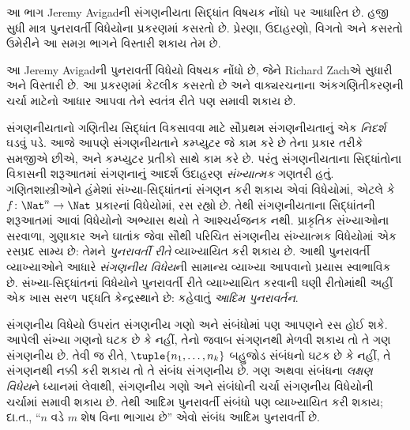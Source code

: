 
\label{guunit:OLP-0208}


\begin{editorial}
  આ ભાગ Jeremy Avigadની સંગણનીયતા સિદ્ધાંત વિષયક નોંધો પર આધારિત છે.
  હજી સુધી માત્ર પુનરાવર્તી વિધેયોના પ્રકરણમાં કસરતો છે. પ્રેરણા,
  ઉદાહરણો, વિગતો અને કસરતો ઉમેરીને આ સમગ્ર ભાગને વિસ્તારી શકાય તેમ છે.
\end{editorial}

\begingroup
\makeatletter{}\makeatother

\label{guunit:OLP-0209}


\begin{editorial}
  આ Jeremy Avigadની પુનરાવર્તી વિધેયો વિષયક નોંધો છે, જેને Richard Zachએ
  સુધારી અને વિસ્તારી છે. આ પ્રકરણમાં કેટલીક કસરતો છે અને વાક્યરચનાના
  અંકગણિતીકરણની ચર્ચા માટેનો આધાર આપવા તેને સ્વતંત્ર રીતે પણ સમાવી શકાય છે.
\end{editorial}

\begingroup
\makeatletter{}\makeatother

\label{guunit:OLP-0210}


સંગણનીયતાનો ગણિતીય સિદ્ધાંત વિકસાવવા માટે સૌપ્રથમ સંગણનીયતાનું એક
\emph{નિદર્શ} ઘડવું પડે. આજે આપણે સંગણનીયતાને કમ્પ્યુટર જે કામ કરે છે
તેના પ્રકાર તરીકે સમજીએ છીએ, અને કમ્પ્યુટર પ્રતીકો સાથે કામ કરે છે. પરંતુ
સંગણનીયતાના સિદ્ધાંતોના વિકાસની શરૂઆતમાં સંગણનાનું આદર્શ ઉદાહરણ
\emph{સંખ્યાત્મક} ગણતરી હતું. ગણિતશાસ્ત્રીઓને હંમેશાં સંખ્યા-સિદ્ધાંતનાં
સંગણન કરી શકાય એવાં વિધેયોમાં, એટલે કે $f\colon \Nat^n \to \Nat$
પ્રકારનાં વિધેયોમાં, રસ રહ્યો છે. તેથી સંગણનીયતાના સિદ્ધાંતની શરૂઆતમાં
આવાં વિધેયોનો અભ્યાસ થયો તે આશ્ચર્યજનક નથી. પ્રાકૃતિક સંખ્યાઓના સરવાળા,
ગુણાકાર અને ઘાતાંક જેવા સૌથી પરિચિત સંગણનીય સંખ્યાત્મક વિધેયોમાં એક
રસપ્રદ સામ્ય છે: તેમને \emph{પુનરાવર્તી રીતે} વ્યાખ્યાયિત કરી શકાય છે.
આથી પુનરાવર્તી વ્યાખ્યાઓને આધારે \emph{સંગણનીય વિધેય}ની સામાન્ય વ્યાખ્યા
આપવાનો પ્રયાસ સ્વાભાવિક છે. સંખ્યા-સિદ્ધાંતનાં વિધેયોને પુનરાવર્તી રીતે
વ્યાખ્યાયિત કરવાની ઘણી રીતોમાંથી અહીં એક ખાસ સરળ પદ્ધતિ કેન્દ્રસ્થાને
છે: કહેવાતું \emph{આદિમ પુનરાવર્તન}.

સંગણનીય વિધેયો ઉપરાંત સંગણનીય ગણો અને સંબંધોમાં પણ આપણને રસ હોઈ શકે.
આપેલી સંખ્યા ગણનો ઘટક છે કે નહીં, તેનો જવાબ સંગણનથી મેળવી
શકાય તો તે ગણ સંગણનીય છે. તેવી જ રીતે, $\tuple{n_1, \dots, n_k}$
બહુજોડ સંબંધનો ઘટક છે કે નહીં, તે સંગણનથી નક્કી કરી શકાય તો
તે સંબંધ સંગણનીય છે. ગણ અથવા સંબંધના \emph{લક્ષણ વિધેય}ને ધ્યાનમાં
લેવાથી, સંગણનીય ગણો અને સંબંધોની ચર્ચા સંગણનીય વિધેયોની ચર્ચામાં
સમાવી શકાય છે. તેથી આદિમ પુનરાવર્તી સંબંધો પણ વ્યાખ્યાયિત કરી શકાય;
દા.ત., ``$n$ વડે $m$ શેષ વિના ભાગાય છે'' એવો સંબંધ આદિમ પુનરાવર્તી છે.

